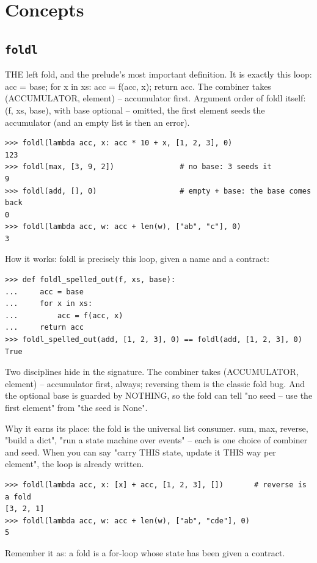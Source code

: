 \documentclass[10pt,letterpaper]{book}
\begin{document}
\section{Concepts}
\subsection{\texttt{foldl}}\label{def:foldl}
THE left fold, and the prelude's most important definition. It is exactly this loop: acc = base; for x in xs: acc = f(acc, x); return acc. The combiner takes (ACCUMULATOR, element) -- accumulator first. Argument order of foldl itself: (f, xs, base), with base optional -- omitted, the first element seeds the accumulator (and an empty list is then an error).
\begin{lstlisting}[style=ex]
>>> foldl(lambda acc, x: acc * 10 + x, [1, 2, 3], 0)
123
>>> foldl(max, [3, 9, 2])               # no base: 3 seeds it
9
>>> foldl(add, [], 0)                   # empty + base: the base comes back
0
>>> foldl(lambda acc, w: acc + len(w), ["ab", "c"], 0)
3
\end{lstlisting}

How it works: foldl is precisely this loop, given a name and a contract:

\begin{lstlisting}[style=ex]
>>> def foldl_spelled_out(f, xs, base):
...     acc = base
...     for x in xs:
...         acc = f(acc, x)
...     return acc
>>> foldl_spelled_out(add, [1, 2, 3], 0) == foldl(add, [1, 2, 3], 0)
True
\end{lstlisting}

Two disciplines hide in the signature. The combiner takes (ACCUMULATOR, element) -- accumulator first, always; reversing them is the classic fold bug. And the optional base is guarded by NOTHING, so the fold can tell "no seed -- use the first element" from "the seed is None".


Why it earns its place: the fold is the universal list consumer. sum, max, reverse, "build a dict", "run a state machine over events" -- each is one choice of combiner and seed. When you can say "carry THIS state, update it THIS way per element", the loop is already written.

\begin{lstlisting}[style=ex]
>>> foldl(lambda acc, x: [x] + acc, [1, 2, 3], [])       # reverse is a fold
[3, 2, 1]
>>> foldl(lambda acc, w: acc + len(w), ["ab", "cde"], 0)
5
\end{lstlisting}

Remember it as: a fold is a for-loop whose state has been given a contract.
\end{document}
